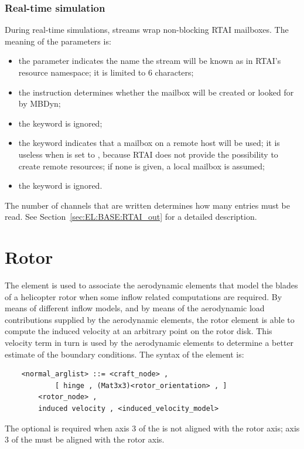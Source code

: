 \subsubsection{Real-time simulation}
During real-time simulations, streams wrap non-blocking RTAI mailboxes.
The meaning of the parameters is:
\begin{itemize}
\item the parameter  indicates the name the stream
will be known as in RTAI's resource namespace; it is limited to 6 characters;
\item the instruction  determines whether the mailbox will be
created or looked for by MBDyn;
\item the keyword  is ignored;
\item the keyword  indicates that a mailbox on a remote host 
will be used; it is useless when  is set to , because
RTAI does not provide the possibility to create remote resources;
if none is given, a local mailbox is assumed;
\item the keyword  is ignored.
\end{itemize}

The number of channels  that are written
determines how many  entries must be read.
See Section~\ref{sec:EL:BASE:RTAI_out} for a detailed description.






\section{Rotor}
The  element is used to associate the aerodynamic elements that
model the blades of a helicopter rotor when some inflow related computations 
are required.
By means of different inflow models, and by means of the
aerodynamic load contributions supplied by the aerodynamic elements, the
rotor element is able to compute the induced velocity at an arbitrary point on
the rotor disk. This velocity term in turn is used by the aerodynamic
elements to determine a better estimate of the boundary conditions.
The syntax of the  element is:
\begin{verbatim}
    <normal_arglist> ::= <craft_node> ,
            [ hinge , (Mat3x3)<rotor_orientation> , ]
        <rotor_node> ,
        induced velocity , <induced_velocity_model>
\end{verbatim}
The optional  is required when axis 3 
of the  is not aligned with the rotor axis; axis 3
of the  must be aligned with the rotor axis.

